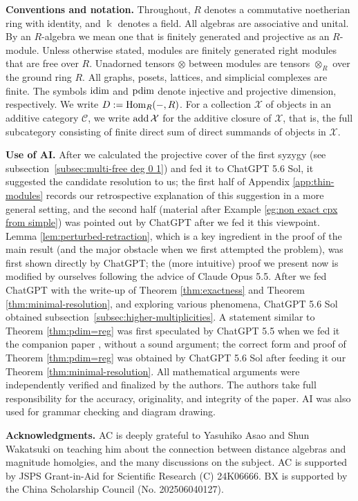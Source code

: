 \documentclass[a4paper,leqno]{amsart}
\begin{document}
\medskip
\noindent
{\bf Conventions and notation.} Throughout, $R$ denotes a commutative noetherian ring with identity, and $\Bbbk$ denotes a field. All algebras are associative and unital. By an $R$-algebra we mean one that is finitely generated and projective as an $R$-module. Unless otherwise stated, modules are finitely generated right modules that are free over $R$. Unadorned tensors $\otimes$ between modules are tensors $\otimes_R$ over the ground ring $R$. All graphs, posets, lattices, and simplicial complexes are finite. The symbols $\operatorname{idim}$ and $\operatorname{pdim}$ denote injective and projective dimension, respectively. We write $D:=\operatorname{Hom}_R(-,R)$. For a collection $\mathcal{X}$ of objects in an additive category $\mathcal{C}$, we write $\operatorname{add} \mathcal{X}$ for the additive closure of $\mathcal{X}$, that is, the full subcategory consisting of finite direct sum of direct summands of objects in $\mathcal{X}$.

\medskip
\noindent
\textbf{Use of AI.} After we calculated the projective cover of the first syzygy (see subsection~\ref{subsec:multi-free deg 0 1}) and fed it to ChatGPT 5.6 Sol, it suggested the candidate resolution to us; the first half of Appendix \ref{app:thin-modules} records our retrospective explanation of this suggestion in a more general setting, and the second half (material after Example \ref{eg:non exact cpx from simple}) was pointed out by ChatGPT after we fed it this viewpoint.
Lemma \ref{lem:perturbed-retraction}, which is a key ingredient in the proof of the main result (and the major obstacle when we first attempted the problem), was first shown directly by ChatGPT; the (more intuitive) proof we present now is modified by ourselves following the advice of Claude Opus 5.5.
After we fed ChatGPT with the write-up of Theorem \ref{thm:exactness} and 
Theorem \ref{thm:minimal-resolution}, and exploring various phenomena, ChatGPT 5.6 Sol obtained subsection~\ref{subsec:higher-multiplicities}.
A statement similar to Theorem \ref{thm:pdim=reg} was first speculated by ChatGPT 5.5 when we fed it the companion paper \cite{CX26}, without a sound argument; the correct form and proof of Theorem \ref{thm:pdim=reg} was obtained by ChatGPT 5.6 Sol after feeding it our Theorem \ref{thm:minimal-resolution}.
All mathematical arguments were independently verified and finalized by the authors. The authors take full responsibility for the accuracy, originality, and integrity of the paper.
AI was also used for grammar checking and diagram drawing.

\medskip
\noindent
\textbf{Acknowledgments.}
AC is deeply grateful to Yasuhiko Asao and Shun Wakatsuki on teaching him about the connection between distance algebras and magnitude homolgies, and the many discussions on the subject.
AC is supported by JSPS Grant-in-Aid for Scientific Research (C) 24K06666. BX is supported by the China Scholarship Council (No. 202506040127).
\end{document}
